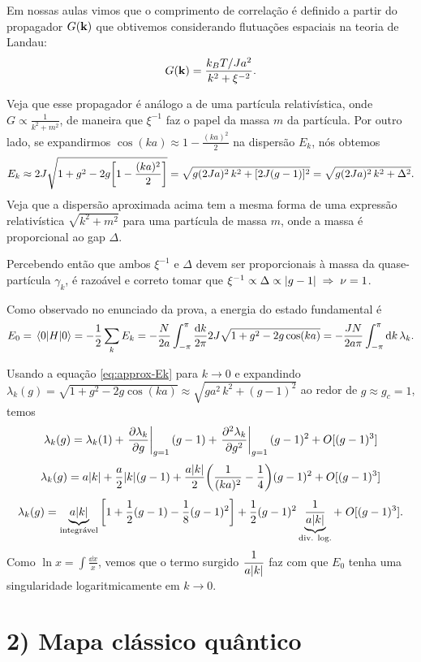 \documentclass[a4paper,10pt]{article}
\begin{document}
Em nossas aulas vimos que o comprimento de correlação é definido a partir do propagador $G(\vb{k})$ que obtivemos considerando flutuações espaciais na teoria de Landau:
$$
G(\vb{k}) = \frac{k_B T / Ja^2}{k^2 + \xi^{-2}}.
$$

Veja que esse propagador é análogo a de uma partícula relativística, onde $G \propto \frac{1}{k^2 + m^2}$, de maneira que $\xi^{-1}$ faz o papel da massa $m$ da partícula. Por outro lado, se expandirmos $\cos(ka) \approx 1 - \frac{(ka)^2}{2}$ na dispersão $E_k$, nós obtemos
\begin{equation} \label{eq:approx-Ek}
E_k \approx 2J \sqrt{1 + g^2 - 2g \qty[1-\frac{(ka)^2}{2}]} =
\sqrt{g(2J a)^2 \, k^2 + [2J(g-1)]^2} = \sqrt{g(2J a)^2 \, k^2 + \Delta^2}.
\end{equation}
Veja que a dispersão aproximada acima tem a mesma forma de uma expressão relativística $\sqrt{k^2 + m^2}$ para uma partícula de massa $m$, onde a massa é proporcional ao gap $\Delta$.

\n

Percebendo então que ambos $\xi^{-1}$ e $\Delta$ devem ser proporcionais à massa da quase-partícula $\gamma_k$, é razoável e correto tomar que $\xi^{-1} \propto \Delta \propto \abs{g-1} \; \Rightarrow \; \nu = 1$.

\n

Como observado no enunciado da prova, a energia do estado fundamental é
$$
E_0 = \ev{H}{0} = -\frac{1}{2} \sum_{k} E_k =
- \frac{N}{2a} \int_{-\pi}^{\pi} \frac{\dd{k}}{2\pi} 2J \sqrt{1 + g^2 - 2g\cos(ka)} =
- \frac{J N}{2a \pi} \int_{-\pi}^{\pi} \dd{k} \lambda_k.
$$

Usando a equação \ref{eq:approx-Ek} para $k\to 0$ e expandindo $\lambda_{k}(g) = \sqrt{1 + g^2 - 2g\cos(ka)} \approx \sqrt{ga^2 \, k^2 + (g-1)^2}$ ao redor de $g \approx g_c = 1$, temos
$$
\lambda_k(g) = \lambda_k(1) + \eval{\pdv{\lambda_k}{g}}_{g=1} (g-1) + \eval{\pdv[2]{\lambda_k}{g}}_{g=1} (g-1)^2 + O[(g-1)^3]
$$
$$
\lambda_k(g) = a\abs{k} + \frac{a}{2} \abs{k} (g-1) + \frac{a\abs{k}}{2} \qty(\frac{1}{(ka)^2} - \frac{1}{4}) (g-1)^2 + O[(g-1)^3]
$$
$$
\lambda_k(g) = \underbrace{a\abs{k}}_{\text{integrável}} \qty[1 + \frac{1}{2} (g-1) - \frac{1}{8} (g-1)^2 ] +
\frac{1}{2} (g-1)^2 \underbrace{\frac{1}{a\abs{k}}}_{\text{div. log.}} + \; O[(g-1)^3].
$$
Como $\ln x = \int \frac{\dd{x}}{x}$, vemos que o termo surgido $\displaystyle{\frac{1}{a\abs{k}}}$ faz com que $E_0$ tenha uma singularidade logaritmicamente em $k \to 0$.

\n

\section*{2) Mapa clássico quântico}
\end{document}
